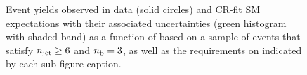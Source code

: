 \begin{figure}[h!]
\begin{center}
    \caption{Event yields observed in data (solid circles) and CR-fit SM expectations with their associated uncertainties (green histogram with shaded band) as a function of \HTmiss based on a sample of events that satisfy $n_{\text{jet}} \geq 6$ and $n_{\text{b}} = 3$, as well as the requirements on \scalht indicated by each sub-figure caption. }
    \label{fig:mhtdim_ge6j_eq3b}
  \end{center}
\end{figure}
